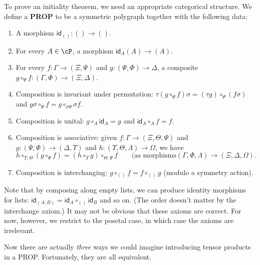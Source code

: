 \documentclass{book}
\def\idfunc{\mathsf{id}}
\begin{document}
To prove an initiality theorem, we need an appropriate categorical structure.
We define a \textbf{PROP} to be a symmetric polygraph \cP together with the following data:
\begin{enumerate}
\item A morphism $\idfunc_{()}:()\to ()$.
\item For every $A\in\cP$, a morphism $\idfunc_A (A)\to (A)$.
\item For every $f:\Gamma\to (\Xi,\Psi)$ and $g:(\Psi,\Phi)\to \Delta$, a composite $g\circ_\Psi f : (\Gamma,\Phi) \to (\Xi,\Delta)$.
\item Composition is invariant under permutation: $\tau(g\circ_\Psi f)\sigma = (\tau g)\circ_\Psi (f\sigma)$ and $g\sigma \circ_\Psi f = g\circ_{\sigma \Psi} \sigma f$.
\item Composition is unital:
  $g\circ_A \idfunc_A = g$ and $\idfunc_A\circ_A f = f$.
\item Composition is associative: given $f:\Gamma\to (\Xi,\Theta,\Psi)$ and $g:(\Psi,\Phi)\to (\Delta,\Upsilon)$ and $h:(\Upsilon,\Theta,\Lambda)\to \Omega$, we have
  \[h \circ_{\Upsilon,\Theta} (g\circ_\Psi f) = (h\circ_\Upsilon g) \circ_{\Theta,\Psi} f \qquad \text{(as morphisms} (\Gamma,\Phi,\Lambda) \to (\Xi,\Delta,\Omega). \]
\item Composition is interchanging: $g\circ_{()}f = f\circ_{()}g$ (modulo a symmetry action).
\end{enumerate}
Note that by composing along empty lists, we can produce identity morphisms for lists: $\idfunc_{(A,B)} = \idfunc_A \circ_{()} \idfunc_B$ and so on.
(The order doesn't matter by the interchange axiom.)
It may not be obvious that these axioms are correct.
For now, however, we restrict to the posetal case, in which case the axioms are irrelevant.

Now there are actually \emph{three} ways we could imagine introducing tensor products in a PROP.
Fortunately, they are all equivalent.
\end{document}
